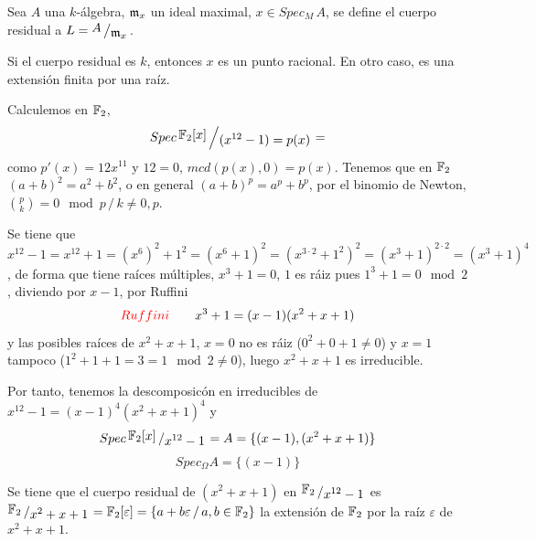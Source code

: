 \begin{defi}
    Sea $A$ una $k$-\'algebra, $\mathfrak{m}_x$ un ideal maximal, $x\in Spec_M\, A$, se define el cuerpo residual a $L = \modulo{A}{\m_x}$.
\end{defi}
\begin{prop}
    Si el cuerpo residual es $k$, entonces $x$ es un punto racional. En otro caso, es una extensión finita por una ra\'iz.
\end{prop}
\begin{ejem}
    Calculemos en $\mathbb{F}_2$, 
    $$Spec\, \modulo{\bb F_2{[x]}}{(x^{12}-1)=p(x)} = $$
    como $p'(x) = 12x^{11}$ y $12=0$, $mcd(p(x),0) = p(x)$. Tenemos que en $\mathbb{F}_2$ $(a+b)^2 = a^2+b^2$, o en general $(a+b)^p = a^p+b^p$, por el binomio de Newton, $\binom{p}{k} = 0 \mod p \, / \, k \neq 0,p$.

    Se tiene que $x^{12}-1 = x^{12} + 1 = (x^6)^2+1^2 = (x^6+1)^2 = (x^{3\cdot 2} + 1^2) ^2 = (x^3+1)^{2\cdot 2} = (x^3+1)^4$, de forma que tiene ra\'ices m\'ultiples, $x^3+1=0$, $1$ es r\'aiz pues $1^3+1=0 \mod 2$, diviendo por $x-1$, por Ruffini
    $$\textcolor{red}{Ruffini} \qquad x^3+1 = (x-1)(x^2+x+1) $$
    y las posibles ra\'ices de $x^2+x+1$, $x=0$ no es r\'aiz ($0^2+0+1\neq 0$) y $x=1$ tampoco ($1^2+1+1 = 3 =1 \mod 2\neq 0$), luego $x^2+x+1$ es irreducible.

    Por tanto, tenemos la descomposic\'on en irreducibles de $x^{12}-1 = (x-1)^4(x^2+x+1)^4$ y 
    $$Spec\, \modulo{\bb F_2[x]}{x^{12}-1 }=A = \{(x-1), (x^2+x+1)\}$$
    $$Spec_{\Omega} A = \{(x-1)\} $$

    Se tiene que el cuerpo residual de $(x^2+x+1)$ en $\modulo{\bb F_2}{x^{12}-1}$ es $\modulo{\bb F_2}{x^2+x+1} = \bb F_2[\varepsilon] = \{a+b\varepsilon \, / \, a,b \in \bb F_2\}$ la extensi\'on de $\mathbb{F}_2$ por la ra\'iz $\varepsilon$ de $x^2+x+1$. 
\end{ejem} 

